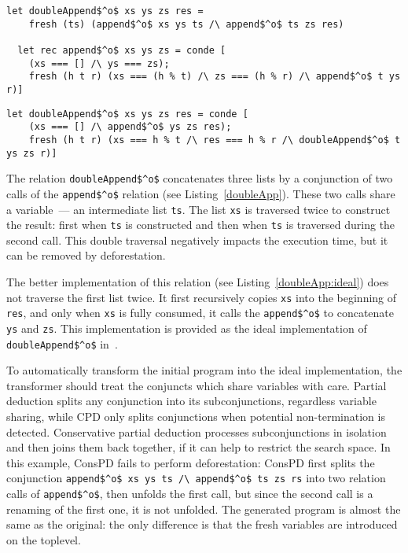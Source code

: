 \begin{figure*}[!t]
  \centering
  \begin{minipage}{\textwidth}
    \begin{lstlisting}[label={doubleApp}, caption={Concatenation of three lists}, captionpos=b, frame=tb]
  let doubleAppend$^o$ xs ys zs res =
    fresh (ts) (append$^o$ xs ys ts /\ append$^o$ ts zs res)

  let rec append$^o$ xs ys zs = conde [
    (xs === [] /\ ys === zs);
    fresh (h t r) (xs === (h % t) /\ zs === (h % r) /\ append$^o$ t ys r)]
    \end{lstlisting}
  \end{minipage}

  \begin{minipage}{\textwidth}
\begin{lstlisting}[label={doubleApp:ideal}, caption={Ideal implementation of concatenation of three lists}, captionpos=b, frame=tb]
  let doubleAppend$^o$ xs ys zs res = conde [
    (xs === [] /\ append$^o$ ys zs res);
    fresh (h t r) (xs === h % t /\ res === h % r /\ doubleAppend$^o$ t ys zs r)]
\end{lstlisting}
  \end{minipage}
\end{figure*}

The relation \lstinline{doubleAppend$^o$} concatenates three lists by a conjunction of two calls of the \lstinline{append$^o$} relation (see Listing~\ref{doubleApp}).
These two calls share a variable~--- an intermediate list \lstinline{ts}.
The list \lstinline{xs} is traversed twice to construct the result: first when \lstinline{ts} is constructed and then when \lstinline{ts} is traversed during the second call.
This double traversal negatively impacts the execution time, but it can be removed by deforestation.

The better implementation of this relation (see Listing~\ref{doubleApp:ideal}) does not traverse the first list twice.
It first recursively copies \lstinline{xs} into the beginning of \lstinline{res}, and only when \lstinline{xs} is fully consumed, it calls the \lstinline{append$^o$} to concatenate \lstinline{ys} and \lstinline{zs}.
This implementation is provided as the ideal implementation of \lstinline{doubleAppend$^o$} in~\cite{de1999conjunctive}.

To automatically transform the initial program into the ideal implementation, the transformer should treat the conjuncts which share variables with care.
Partial deduction splits any conjunction into its subconjunctions, regardless variable sharing, while CPD only splits conjunctions when potential non-termination is detected.
Conservative partial deduction processes subconjunctions in isolation and then joins them back together, if it can help to restrict the search space.
In this example, ConsPD fails to perform deforestation: ConsPD first splits the conjunction \lstinline{append$^o$ xs ys ts /\ append$^o$ ts zs rs} into two relation calls of \lstinline{append$^o$}, then unfolds the first call, but since the second call is a renaming of the first one, it is not unfolded.
The generated program is almost the same as the original: the only difference is that the fresh variables are introduced on the toplevel.


